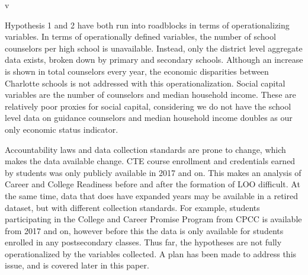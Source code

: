 \vspace{2cm}v


Hypothesis 1 and 2 have both run into roadblocks in terms of operationalizing variables. In terms of operationally defined variables, the number of school counselors per high school is unavailable. 
Instead, only the district level aggregate data exists, broken down by primary and secondary schools. 
Although an increase is shown in total counselors every year, the economic disparities between Charlotte schools is not addressed with this operationalization. 
Social capital variables are the number of counselors and median household income. 
These are relatively poor proxies for social capital, considering we do not have the school level data on guidance counselors and median household income doubles as our only economic status indicator. 

Accountability laws and data collection standards are prone to change, which makes the data available change. 
CTE course enrollment and credentials earned by students was only publicly available in 2017 and on. 
This makes an analysis of Career and College Readiness before and after the formation of LOO difficult. 
At the same time, data that does have expanded years may be available in a retired dataset, but with different collection standards. 
For example, students participating in the College and Career Promise Program from CPCC is available from 2017 and on, however before this the data is only available for students enrolled in any postsecondary classes. 
Thus far, the hypotheses are not fully operationalized by the variables collected. 
A plan has been made to address this issue, and is covered later in this paper. 
